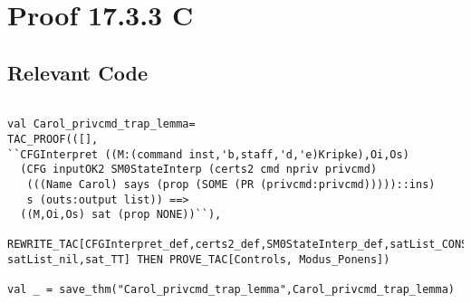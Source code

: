 \documentclass{report}
\begin{document}
\begin{session}
\begin{scriptsize}
\begin{verbatim}
\end{verbatim}
  \end{scriptsize}
\end{session}


\section{Proof 17.3.3 C}
\label{proof-7}

\subsection{Relevant Code}
\label{rel-code-7}
\begin{lstlisting}[frame=TBlr]

val Carol_privcmd_trap_lemma=
TAC_PROOF(([],
``CFGInterpret ((M:(command inst,'b,staff,'d,'e)Kripke),Oi,Os)
  (CFG inputOK2 SM0StateInterp (certs2 cmd npriv privcmd)
   (((Name Carol) says (prop (SOME (PR (privcmd:privcmd)))))::ins)
   s (outs:output list)) ==>
  ((M,Oi,Os) sat (prop NONE))``),
  REWRITE_TAC[CFGInterpret_def,certs2_def,SM0StateInterp_def,satList_CONS, satList_nil,sat_TT] THEN PROVE_TAC[Controls, Modus_Ponens])

val _ = save_thm("Carol_privcmd_trap_lemma",Carol_privcmd_trap_lemma)


\end{lstlisting}
\end{document}
